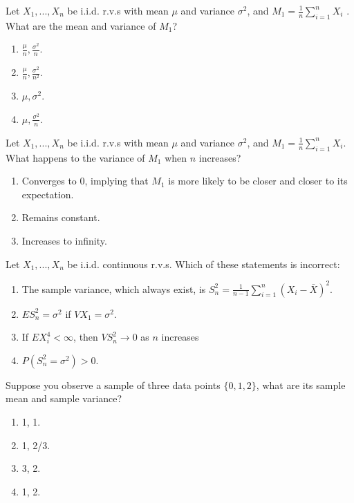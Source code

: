 \documentclass[poll_tutorial_format]{subfiles}
\begin{document}
	\begin{exercise}
		Let $X_1, . . . ,X_n$ be i.i.d. r.v.s with mean $\mu$ and variance $\sigma^2$, and $M_1=\frac{1}{n}\sum_{i=1}^n X_i$ . What are the mean and variance of $M_1$? 
		\begin{enumerate}
			\item $\frac{\mu}{n}, \frac{\sigma^2}{n}$.
			\item $\frac{\mu}{n}, \frac{\sigma^2}{n^2}$.			
			\item ${\mu}{},  {\sigma^2}{}$.			
			\item ${\mu}{},  \frac{\sigma^2}{n}$.
		\end{enumerate}
	\end{exercise}
	

	
		\begin{exercise}
		Let $X_1, . . . ,X_n$ be i.i.d. r.v.s with mean $\mu$ and variance $\sigma^2$, and $M_1=\frac{1}{n}\sum_{i=1}^n X_i$. What happens to the variance of $M_1$ when $n$ increases? 
		\begin{enumerate}
			\item Converges to 0, implying that $M_1$ is more likely to be closer and closer to its expectation. 
			\item Remains constant.			
			\item Increases to infinity.			
		\end{enumerate}
	\end{exercise}
	
	
	
	\begin{exercise}
	Let $X_1, . . . ,X_n$ be i.i.d. continuous r.v.s.
	Which of these statements is incorrect: 
		\begin{enumerate}
			\item The sample variance, which always exist, is $S_n^2=\frac{1}{n-1}\sum_{i=1}^n (X_i-\bar{X})^2$.
			\item $E{S_n^2} =\sigma^2$ if $V{X_1}=\sigma^2$.
			\item If $E{X^4_i} <\infty$, then $V{S_n^2} \rightarrow 0$ as $n$ increases 
			\item $P{(S_n^2 =\sigma^2)} >0$. 
		\end{enumerate}
	\end{exercise}
	

	
\begin{exercise}
	Suppose you observe a sample of three data points $\{0,1,2\}$, what are its sample mean and sample variance? 
	\begin{enumerate}
		\item  1, 1.
		\item  1, 2/3.
		\item  3, 2. 
		\item  1, 2. 
	\end{enumerate}
\end{exercise}
\end{document}
